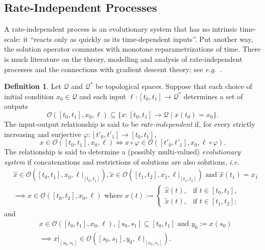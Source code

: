 \documentclass[reqno]{amsart}
\theoremstyle{definition}
\newtheorem{definition}[theorem]{Definition}
\begin{document}
\subsection{Rate-Independent Processes}

A rate-independent process is an evolutionary system that has no intrinsic time-scale:  it ``reacts only as quickly as its time-dependent inputs''.  Put another way, the solution operator commutes with monotone reparametrizations of time.  There is much literature on the theory, modelling and analysis of rate-independent processes and the connections with gradient descent theory; see \emph{e.g.}\ \cite{Mielke:2005, Mielke:2007, MielkeRossiSavare:2009}.

\begin{definition}
	\label{defn:rate-independence}
	Let $\mathcal{Q}$ and $\mathcal{Q}^{\ast}$ be topological spaces.  Suppose that each choice of initial condition $x_{0} \in \mathcal{Q}$ and each input $\ell \colon [t_{0}, t_{1}] \to \mathcal{Q}^{\ast}$ determines a set of outputs
	\[
		\mathcal{O}([t_{0}, t_{1}], x_{0}, \ell) \subseteq \{ x \colon [t_{0}, t_{1}] \to \mathcal{Q} \mid x(t_{0}) = x_{0} \}.
	\]
	The input-output relationship is said to be \emph{rate-independent} if, for every strictly increasing and surjective $\varphi \colon [t'_{0}, t'_{1}] \to [t_{0}, t_{1}]$,
	\[
		x \in \mathcal{O}([t_{0}, t_{1}], x_{0}, \ell) \iff x \circ \varphi \in \mathcal{O}([t'_{0}, t'_{1}], x_{0}, \ell \circ \varphi).
	\]
	The relationship is said to determine a (possibly multi-valued) \emph{evolutionary system} if concatenations and restrictions of solutions are also solutions, \emph{i.e.}
	\begin{align*}
		& \hat{x} \in \mathcal{O}([t_{0}, t_{1}], x_{0}, \ell|_{[t_{0}, t_{1}]}), \tilde{x} \in \mathcal{O}([t_{1}, t_{2}], x_{1}, \ell|_{[t_{1}, t_{2}]}) \text{ and } \hat{x}(t_{1}) = x_{1} \\
		& \implies x \in \mathcal{O}([t_{0}, t_{2}], x_{0}, \ell) \text{ where } x(t) := \begin{cases} \hat{x}(t), & \text{if $t \in [t_{0}, t_{1}]$,} \\ \tilde{x}(t), & \text{if $t \in [t_{1}, t_{2}]$;} \end{cases}
	\end{align*}
	and
	\begin{align*}
		& x \in \mathcal{O}([t_{0}, t_{1}], x_{0}, \ell), [s_{0}, s_{1}] \subseteq [t_{0}, t_{1}] \text{ and } y_{0} := x(s_{0}) \\
		& \implies x|_{[s_{0}, s_{1}]} \in \mathcal{O}([s_{0}, s_{1}], y_{0}, \ell|_{[s_{0}, s_{1}]}).
	\end{align*}
\end{definition}
\end{document}
